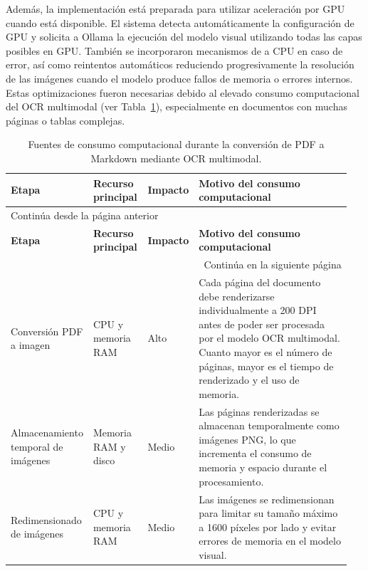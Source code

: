 Además, la implementación está preparada para utilizar aceleración por GPU cuando está disponible. El sistema detecta automáticamente la configuración de GPU y solicita a Ollama la ejecución del modelo visual utilizando todas las capas posibles en GPU. También se incorporaron mecanismos de  a CPU en caso de error, así como reintentos automáticos reduciendo progresivamente la resolución de las imágenes cuando el modelo produce fallos de memoria o errores internos. Estas optimizaciones fueron necesarias debido al elevado consumo computacional del OCR multimodal (ver Tabla~\ref{tabla:consumoOCR}), especialmente en documentos con muchas páginas o tablas complejas.

\begin{longtable}{p{0.22\linewidth} p{0.16\linewidth} p{0.12\linewidth} p{0.45\linewidth}}
\caption{Fuentes de consumo computacional durante la conversión de PDF a Markdown mediante OCR multimodal.}
\label{tabla:consumoOCR}\\

\toprule
\textbf{Etapa} &
\textbf{Recurso principal} &
\textbf{Impacto} &
\textbf{Motivo del consumo computacional} \\
\midrule
\endfirsthead

\multicolumn{4}{l}{Continúa desde la página anterior}\\
\toprule
\textbf{Etapa} &
\textbf{Recurso principal} &
\textbf{Impacto} &
\textbf{Motivo del consumo computacional} \\
\midrule
\endhead

\midrule
\multicolumn{4}{r}{Continúa en la siguiente página}\\
\endfoot

\bottomrule
\endlastfoot

Conversión PDF a imagen &
CPU y memoria RAM &
Alto &
Cada página del documento debe renderizarse individualmente a 200 DPI antes de poder ser procesada por el modelo OCR multimodal. Cuanto mayor es el número de páginas, mayor es el tiempo de renderizado y el uso de memoria. \\

Almacenamiento temporal de imágenes &
Memoria RAM y disco &
Medio &
Las páginas renderizadas se almacenan temporalmente como imágenes PNG, lo que incrementa el consumo de memoria y espacio durante el procesamiento. \\

Redimensionado de imágenes &
CPU y memoria RAM &
Medio &
Las imágenes se redimensionan para limitar su tamaño máximo a 1600 píxeles por lado y evitar errores de memoria en el modelo visual. \\


\end{longtable}
